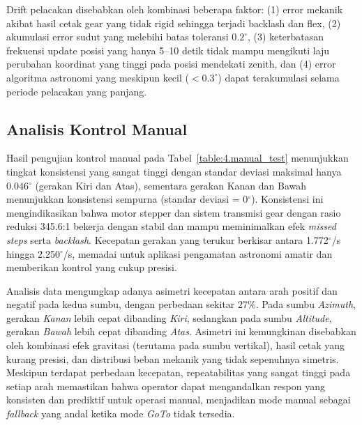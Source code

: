 Drift pelacakan disebabkan oleh kombinasi beberapa faktor: (1) error mekanik akibat hasil cetak gear yang tidak rigid sehingga terjadi backlash dan flex, (2) akumulasi error sudut yang melebihi batas toleransi $0.2^\circ$, (3) keterbatasan frekuensi update posisi yang hanya 5--10 detik tidak mampu mengikuti laju perubahan koordinat yang tinggi pada posisi mendekati zenith, dan (4) error algoritma astronomi yang meskipun kecil ($< 0.3^\circ$) dapat terakumulasi selama periode pelacakan yang panjang. \par


\subsection{Analisis Kontrol Manual} \label{IV.AnalisisManualKomunikasi}
Hasil pengujian kontrol manual pada Tabel~\ref{table:4.manual_test} menunjukkan tingkat konsistensi yang sangat tinggi dengan standar deviasi maksimal hanya 0.046$^\circ$ (gerakan Kiri dan Atas), sementara gerakan Kanan dan Bawah menunjukkan konsistensi sempurna (standar deviasi = 0$^\circ$). Konsistensi ini mengindikasikan bahwa motor stepper dan sistem transmisi gear dengan rasio reduksi 345.6:1 bekerja dengan stabil dan mampu meminimalkan efek \textit{missed steps} serta \textit{backlash}. Kecepatan gerakan yang terukur berkisar antara 1.772$^\circ$/s hingga 2.250$^\circ$/s, memadai untuk aplikasi pengamatan astronomi amatir dan memberikan kontrol yang cukup presisi. \par

Analisis data mengungkap adanya asimetri kecepatan antara arah positif dan negatif pada kedua sumbu, dengan perbedaan sekitar 27\%. Pada sumbu \textit{Azimuth}, gerakan \textit{Kanan} lebih cepat dibanding \textit{Kiri}, sedangkan pada sumbu \textit{Altitude}, gerakan \textit{Bawah} lebih cepat dibanding \textit{Atas}. Asimetri ini kemungkinan disebabkan oleh kombinasi efek gravitasi (terutama pada sumbu vertikal), hasil cetak yang kurang presisi, dan distribusi beban mekanik yang tidak sepenuhnya simetris. Meskipun terdapat perbedaan kecepatan, repeatabilitas yang sangat tinggi pada setiap arah memastikan bahwa operator dapat mengandalkan respon yang konsisten dan prediktif untuk operasi manual, menjadikan mode manual sebagai \textit{fallback} yang andal ketika mode \textit{GoTo} tidak tersedia. \par


